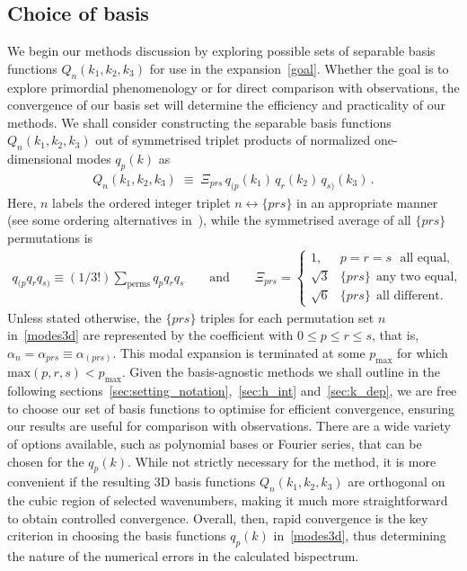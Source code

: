 \documentclass[a4paper,12pt]{extarticle}
\newcommand{\Pmax}{p_\text{max}}
\begin{document}
\subsection{Choice of basis}\label{sec:choice_of_basis}
We begin our methods discussion by exploring possible sets of separable
basis functions $Q_n(k_1,k_2,k_3)$
for use in the expansion~\eqref{goal}.
Whether the goal is to explore primordial phenomenology or for direct comparison with observations,
the convergence of our basis set will determine the efficiency and practicality
of our methods.
We shall consider constructing the separable basis functions $Q_n(k_1,k_2,k_3)$
out of symmetrised triplet products of normalized one-dimensional modes $q_p(k)$ as
\begin{align}\label{modes3d}
    Q_n(k_1,k_2,k_3) \;\equiv\; {\Xi_{prs} } \, q_{(p} (k_1) \, q_{r}(k_2)\, q_{s)}(k_3)\,.
\end{align}
Here,  $n$ labels the ordered integer triplet $n \leftrightarrow \{p r s\}$ in an appropriate manner (see some ordering alternatives in~\cite{FergShell_3}), while the symmetrised average of all $\{p r s\}$ permutations is 
\begin{align}\label{modes3d}
    q_{(p}q_{r}q_{s)}\equiv(1/3!)\sum_\text{perms}q_{p}q_{r}q_{s}\qquad \text{and} \qquad 
     \Xi_{prs}= 
     \begin{cases}
     1, & p = r = s ~~~\text{all equal},\\
     \sqrt{3} & \{p r s\} ~~\text{any two equal,} \\
     \sqrt{6} & \{p r s\}  ~~\text{all  different.}
     \end{cases}
\end{align}
Unless stated otherwise, the $\{prs\}$ triples for each permutation set $n$
in~\eqref{modes3d} are represented by the coefficient with $0\le p\le r\le s$,
that is, $\alpha_n = \alpha_{prs} \equiv \alpha_{(prs)}$.
This modal expansion is terminated at some $\Pmax$ for which $\text{max}(p,r,s)<\Pmax$. 
Given the basis-agnostic methods we shall outline in the following 
sections~\ref{sec:setting_notation},~\ref{sec:h_int} and~\ref{sec:k_dep},
we are free to choose our set of basis functions to optimise for efficient convergence,
ensuring our results are useful for comparison with observations. 
There are a wide variety of options available, such as polynomial bases
or Fourier series, that can be chosen for the $q_p(k)$.
While not strictly necessary for the method, it is more convenient if 
the resulting 3D basis functions $Q_n(k_1,k_2,k_3)$
are orthogonal on the cubic region of selected wavenumbers, making it much more straightforward to obtain controlled convergence. Overall, then, rapid convergence is the key criterion in choosing the basis functions $q_p(k)$ in~\eqref{modes3d}, thus determining the nature of the numerical errors in the calculated bispectrum.
\end{document}
